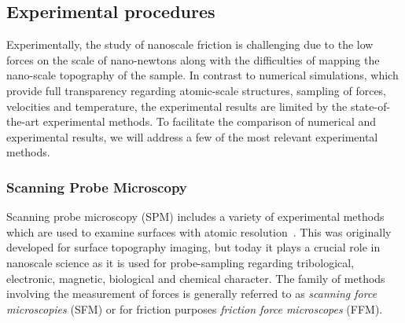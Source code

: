 



\subsection{Experimental procedures}

Experimentally, the study of nanoscale friction is challenging due to the low
forces on the scale of nano-newtons along with the difficulties of mapping the
nano-scale topography of the sample. In contrast to numerical simulations, which provide full
transparency regarding atomic-scale structures, sampling of forces, velocities
and temperature, the experimental results are limited by the state-of-the-art
experimental methods. To facilitate the comparison of numerical and experimental results, we will address a few of the most relevant experimental methods.


\subsubsection{Scanning Probe Microscopy}\label{sec:SPM} 
Scanning probe microscopy (\acrshort{SPM}) includes a variety of experimental
methods which are used to examine surfaces with atomic resolution~\cite[pp.
6-27]{BHUSHAN20051507}. This was originally developed for surface topography
imaging, but today it plays a crucial role in nanoscale science as it is used
for probe-sampling regarding tribological, electronic, magnetic, biological and
chemical character. The family of methods involving the measurement of forces is
generally referred to as \textit{scanning force microscopies} (\acrshort{SFM})
or for friction purposes \textit{friction force microscopes} (\acrshort{FFM}).

